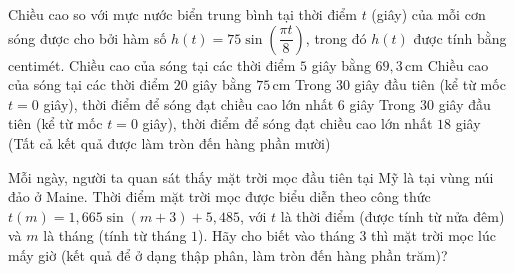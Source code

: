 \begin{ex}%
	Chiều cao so với mực nước biển trung bình tại thời điểm $t$ (giây) của mỗi cơn sóng được cho bởi hàm số $h(t)=75\sin \left(\dfrac{\pi t}{8} \right)$, trong đó  $h(t)$ được tính bằng centimét.
	 \choiceTF
		{\True Chiều cao của sóng  tại các thời điểm $5$ giây bằng $69{,}3$\,cm}
		{\True Chiều  cao của sóng tại các thời điểm $20$ giây bằng $75$\,cm}
		{Trong $30$  giây đầu tiên (kể từ mốc $t=0$ giây), thời điểm để sóng đạt chiều cao lớn nhất $6$ giây}
		{Trong $30$ giây đầu tiên (kể từ mốc $t=0$ giây), thời điểm để sóng đạt chiều cao lớn nhất $18$  giây (Tất cả kết quả được làm tròn đến hàng phần mười)}
\end{ex}



\begin{ex}%
	Mỗi ngày, người ta quan sát thấy mặt trời mọc đầu tiên tại Mỹ là tại vùng núi đảo ở Maine. Thời điểm mặt trời mọc được biểu diễn theo công thức $t(m)=1{,}665\sin (m+3)+5{,}485$, với $t$ là thời điểm (được tính từ nửa đêm) và $m$ là tháng (tính từ tháng $1$). Hãy cho biết vào tháng $3$ thì mặt trời mọc lúc mấy giờ (kết quả để ở  dạng thập phân, làm tròn đến hàng phần trăm)?
\end{ex}

